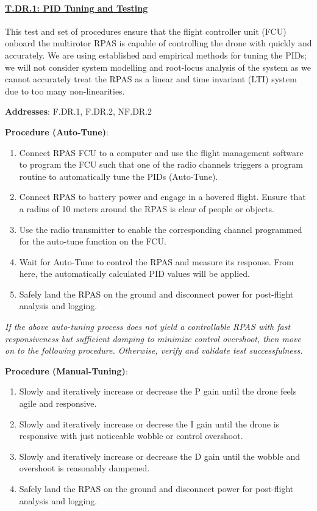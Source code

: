 \paragraph{\underline{T.DR.1: PID Tuning and Testing}}

This test and set of procedures ensure that the flight controller unit (FCU) onboard the multirotor RPAS is capable of controlling the drone with quickly and accurately. We are using established and empirical methods for tuning the PIDs; we will not consider system modelling and root-locus analysis of the system as we cannot accurately treat the RPAS as a linear and time invariant (LTI) system due to too many non-linearities.

\textbf{Addresses}: F.DR.1, F.DR.2, NF.DR.2

\textbf{Procedure (Auto-Tune)}:
\begin{enumerate}[noitemsep]
    \item Connect RPAS FCU to a computer and use the flight management software to program the FCU such that one of the radio channels triggers a program routine to automatically tune the PIDs (Auto-Tune).
    \item Connect RPAS to battery power and engage in a hovered flight. Ensure that a radius of 10 meters around the RPAS is clear of people or objects.
    \item Use the radio transmitter to enable the corresponding channel programmed for the auto-tune function on the FCU.
    \item Wait for Auto-Tune to control the RPAS and measure its response. From here, the automatically calculated PID values will be applied.
    \item Safely land the RPAS on the ground and disconnect power for post-flight analysis and logging.
\end{enumerate}

\textit{If the above auto-tuning process does not yield a controllable RPAS with fast responsiveness but sufficient damping to minimize control overshoot, then move on to the following procedure. Otherwise, verify and validate test successfulness.}

\textbf{Procedure (Manual-Tuning)}:
\begin{enumerate}[noitemsep]
    \item Slowly and iteratively increase or decrease the P gain until the drone feels agile and responsive.
    \item Slowly and iteratively increase or decrese the I gain until the drone is responsive with just noticeable wobble or control overshoot.
    \item Slowly and iteratively increase or decrease the D gain until the wobble and overshoot is reasonably dampened.
    \item Safely land the RPAS on the ground and disconnect power for post-flight analysis and logging.
\end{enumerate}

